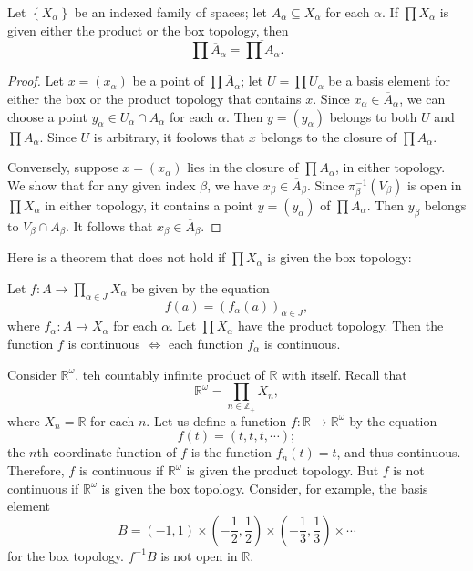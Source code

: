\begin{theorem}
  Let \( \left\lbrace X_\alpha \right\rbrace \) be an indexed family of spaces;
  let \( A_\alpha \subseteq X_\alpha \) for each \( \alpha \).
  If \( \prod X_\alpha \) is given either the product or the box topology, then
  \[
    \prod \overline{A}_\alpha = \overline{\prod A_\alpha}.
  \]
\end{theorem}
\begin{proof}
  Let \( x = (x_\alpha) \) be a point of \( \prod \overline{A}_\alpha \); let \( U = \prod U_\alpha \) be a basis element for either the box or the product topology that contains \( x \).
  Since \( x_\alpha \in \overline{A}_\alpha \), we can choose a point \( y_\alpha \in U_\alpha \cap A_\alpha \) for each \( \alpha \).
  Then \( y = (y_\alpha) \) belongs to both \( U \) and \( \prod A_\alpha \).
  Since \( U \) is arbitrary, it foolows that \( x \) belongs to the closure of \( \prod A_\alpha \).

  Conversely, suppose \( x = (x_\alpha) \) lies in the closure of \( \prod A_\alpha \), in either topology.
  We show that for any given index \( \beta \), we have \( x_\beta \in \overline{A}_\beta \).
  Since \( \pi_\beta^{-1}(V_\beta) \) is open in \( \prod X_{\alpha} \) in either topology, it contains a point \( y = (y_\alpha) \) of \( \prod A_\alpha \).
  Then \( y_\beta \) belongs to \( V_\beta \cap A_\beta \).
  It follows that \( x_\beta \in \overline{A}_\beta \).
\end{proof}

\noindent Here is a theorem that does not hold if \( \prod X_\alpha \) is given the box topology:
\begin{theorem}
  Let \( f: A \to \prod_{\alpha \in J} X_\alpha  \) be given by the equation
  \[
    f(a) = (f_\alpha(a))_{\alpha \in J},
  \]
  where \( f_\alpha: A \to X_\alpha \) for each \( \alpha \).
  Let \( \prod X_\alpha \) have the product topology.
  Then the function \( f \) is continuous \( \iff \) each function \( f_\alpha \) is continuous.
\end{theorem}

\begin{example}
  Consider \( \mathbb{R}^\omega \), teh countably infinite product of \( \mathbb{R} \) with itself.
  Recall that
  \[
    \mathbb{R}^\omega = \prod_{n \in \mathbb{Z}_+} X_n,
  \]
  where \( X_n = \mathbb{R} \) for each \( n \).
  Let us define a function \( f: \mathbb{R} \to \mathbb{R}^\omega \) by the equation
  \[
    f(t) = (t, t, t, \cdots);
  \]
  the \( n \)th coordinate function of \( f \) is the function \( f_n(t) = t \), and thus continuous.
  Therefore, \( f \) is continuous if \( \mathbb{R}^\omega \) is given the product topology.
  But \( f \) is not continuous if \( \mathbb{R}^\omega \) is given the box topology.
  Consider, for example, the basis element
  \[
    B = (-1, 1) \times (-\frac{1}{2}, \frac{1}{2}) \times (-\frac{1}{3}, \frac{1}{3}) \times \cdots
  \]
  for the box topology. \( f^{-1}{B} \) is not open in \( \mathbb{R} \).
\end{example}

